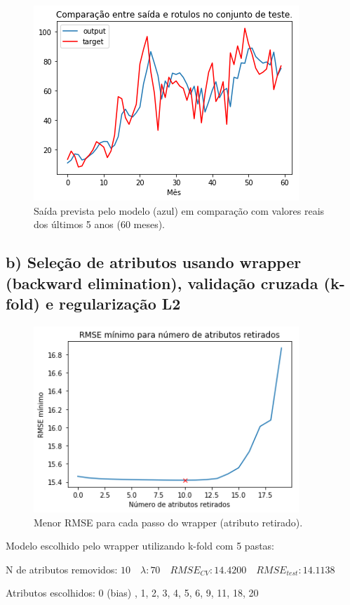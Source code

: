 \documentclass[a4paper, 12pt]{article}
\begin{document}
\begin{figure}[h!]
    \centering
    \includegraphics[width=10cm]{images/raw.png}
    \caption{Saída prevista pelo modelo (azul) em comparação com valores reais dos últimos 5 anos (60 meses).}
\end{figure}

\subsection*{b) Seleção de atributos usando wrapper (backward elimination), validação cruzada (k-fold) e regularização L2}

\begin{figure}[h!]
    \centering
    \includegraphics[width=10cm]{images/backward.png}
    \caption{Menor RMSE para cada passo do wrapper (atributo retirado).}
\end{figure}

Modelo escolhido pelo wrapper utilizando k-fold com 5 pastas:

N de atributos removidos: $10 \quad \lambda: 70 \quad RMSE_{CV}: 14.4200 \quad RMSE_{test}: 14.1138$

Atributos escolhidos: 0 (bias) , 1, 2, 3, 4, 5, 6, 9, 11, 18, 20
\end{document}
